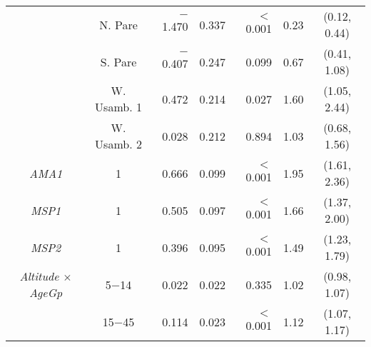 \begin{tabular}{ccrcrcc}
                                   & N. Pare       & $-$1.470   & 0.337   & $<$0.001   & 0.23   & (0.12, 0.44)   \\
                                   & S. Pare       & $-$0.407   & 0.247   & 0.099      & 0.67   & (0.41, 1.08)   \\
                                   & W. Usamb. 1   &    0.472   & 0.214   & 0.027      & 1.60   & (1.05, 2.44)   \\
                                   & W. Usamb. 2   &    0.028   & 0.212   & 0.894      & 1.03   & (0.68, 1.56)   \\
\textit{AMA1}                      & 1             &    0.666   & 0.099   & $<$0.001   & 1.95   & (1.61, 2.36)   \\
\textit{MSP1}                      & 1             &    0.505   & 0.097   & $<$0.001   & 1.66   & (1.37, 2.00)   \\
\textit{MSP2}                      & 1             &    0.396   & 0.095   & $<$0.001   & 1.49   & (1.23, 1.79)   \\
\textit{Altitude $\times$ AgeGp}   & 5$-$14        &    0.022   & 0.022   & 0.335      & 1.02   & (0.98, 1.07)   \\
                                   & 15$-$45       &    0.114   & 0.023   & $<$0.001   & 1.12   & (1.07, 1.17)   \\
\bottomrule
\end{tabular}